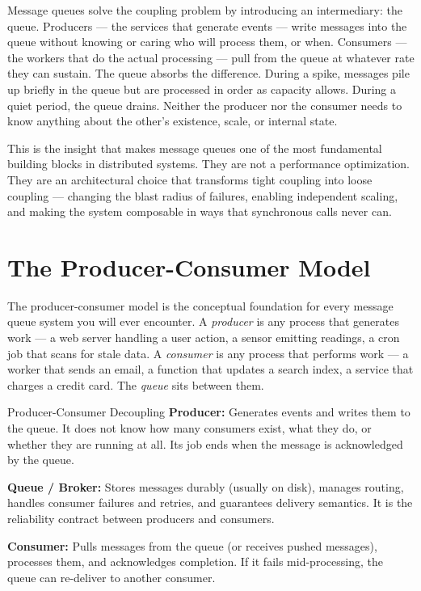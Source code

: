 \documentclass[11pt,a4paper]{article}
\begin{document}
Message queues solve the coupling problem by introducing an intermediary: the queue. Producers --- the services that generate events --- write messages into the queue without knowing or caring who will process them, or when. Consumers --- the workers that do the actual processing --- pull from the queue at whatever rate they can sustain. The queue absorbs the difference. During a spike, messages pile up briefly in the queue but are processed in order as capacity allows. During a quiet period, the queue drains. Neither the producer nor the consumer needs to know anything about the other's existence, scale, or internal state.

This is the insight that makes message queues one of the most fundamental building blocks in distributed systems. They are not a performance optimization. They are an architectural choice that transforms tight coupling into loose coupling --- changing the blast radius of failures, enabling independent scaling, and making the system composable in ways that synchronous calls never can.

\section{The Producer-Consumer Model}

The producer-consumer model is the conceptual foundation for every message queue system you will ever encounter. A \textit{producer} is any process that generates work --- a web server handling a user action, a sensor emitting readings, a cron job that scans for stale data. A \textit{consumer} is any process that performs work --- a worker that sends an email, a function that updates a search index, a service that charges a credit card. The \textit{queue} sits between them.

\begin{termbox}{Producer-Consumer Decoupling}
\textbf{Producer:} Generates events and writes them to the queue. It does not know how many consumers exist, what they do, or whether they are running at all. Its job ends when the message is acknowledged by the queue.

\textbf{Queue / Broker:} Stores messages durably (usually on disk), manages routing, handles consumer failures and retries, and guarantees delivery semantics. It is the reliability contract between producers and consumers.

\textbf{Consumer:} Pulls messages from the queue (or receives pushed messages), processes them, and acknowledges completion. If it fails mid-processing, the queue can re-deliver to another consumer.
\end{termbox}
\end{document}
